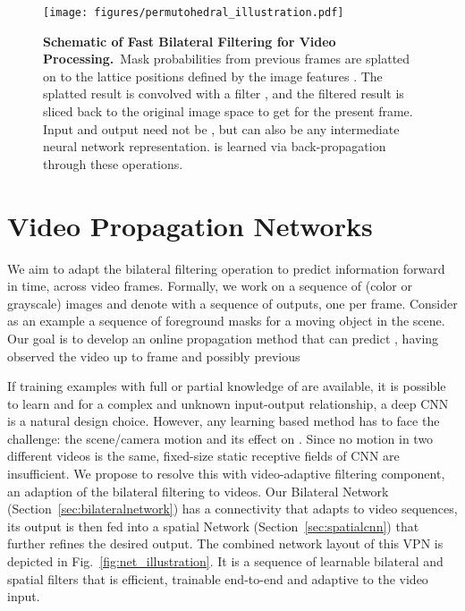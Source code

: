 \documentclass[10pt,twocolumn,letterpaper]{article}
\newcommand{\mycaption}[2]{\caption{\small \textbf{#1.}~#2}}
\begin{document}
\begin{figure*}[th!]
\begin{center}
  \centerline{\texttt{[image: figures/permutohedral\_illustration.pdf]}}
    \mycaption{Schematic of Fast Bilateral Filtering for Video Processing}
    {Mask probabilities from previous frames  are splatted on to the
    lattice positions defined by the image features .
    The splatted result is convolved with a  filter , and the filtered
    result is sliced back to the original image space to get  for the present frame.
    Input and output need not be , but can also be any intermediate neural network representation.
     is learned via back-propagation through these operations.}
    \label{fig:filter_illustration}
    \vspace{-1.0cm}
\end{center}
\end{figure*}

\section{Video Propagation Networks}\label{sec:vpn}

We aim to adapt the bilateral filtering operation to predict information forward in time, across video frames.
Formally, we work on a sequence of  (color or grayscale) images  and denote with  a sequence of outputs, one per frame.
Consider as an example a sequence  of foreground masks for a moving object in the scene.
Our goal is to develop an online propagation method that can
predict , having observed the video up to frame  and possibly previous 

\vspace{-0.3cm}



If training examples  with full or partial knowledge of  are available, it is possible to learn  and for a complex and unknown input-output relationship, a deep CNN is a natural design choice. However, any learning based method has to face the challenge: the scene/camera motion and its
effect on . Since no motion in two different videos is the same, fixed-size static receptive fields of CNN
are insufficient. We propose to resolve this with video-adaptive filtering component, an adaption of the bilateral
filtering to videos.
Our Bilateral Network (Section~\ref{sec:bilateralnetwork}) has a connectivity that adapts to video sequences, its output is then fed into a spatial Network (Section~\ref{sec:spatialcnn}) that further refines the desired output.
The combined network layout of this VPN is depicted in Fig.~\ref{fig:net_illustration}.
It is a sequence of learnable bilateral and spatial filters that is efficient, trainable end-to-end and adaptive to the video input.
\end{document}
